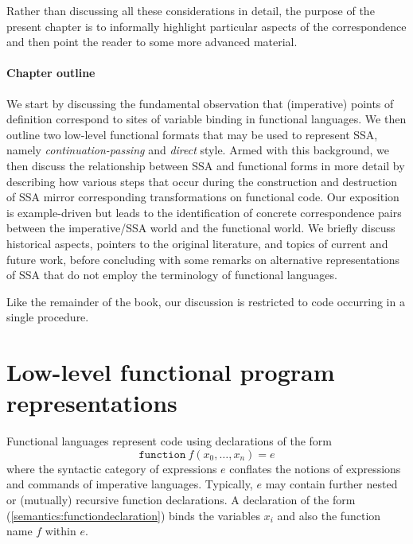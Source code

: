 
Rather than discussing all these considerations in detail, the purpose
of the present chapter is to informally highlight particular aspects
of the correspondence and then point the reader to some more advanced
material.

\paragraph{Chapter outline}
We start by discussing the fundamental observation that (imperative)
points of definition correspond to sites of variable binding in
functional languages. We then outline two low-level functional
formats that may be used to represent SSA, namely
\emph{continuation-passing} and \emph{direct} style. Armed with
this background, we then discuss the relationship between SSA and
functional forms in more detail by describing how various steps that
occur during the construction and destruction of SSA mirror
corresponding transformations on functional code.  Our exposition is
example-driven but leads to the identification of concrete
correspondence pairs between the imperative/SSA world and the
functional world. We briefly discuss historical aspects, pointers to
the original literature, and topics of current and future work, before
concluding with some remarks on alternative representations of
SSA that do not employ the terminology of functional languages.

Like the remainder of the book, our discussion is restricted to code
occurring in a single procedure.

\section{Low-level functional program representations}
\label{section:Part1:Semantics:LowLevelReps}

Functional languages represent code using declarations of the form
\begin{equation}
\label{semantics:functiondeclaration}
\texttt{function}\ f(x_0, \ldots, x_n) = e
\end{equation} 
where the syntactic category of expressions $e$ conflates the notions
of expressions and commands of imperative languages. Typically, $e$
may contain further nested or (mutually) recursive function
declarations. A declaration of the form
(\ref{semantics:functiondeclaration}) binds the variables $x_i$ and
also the function name $f$ within $e$.

